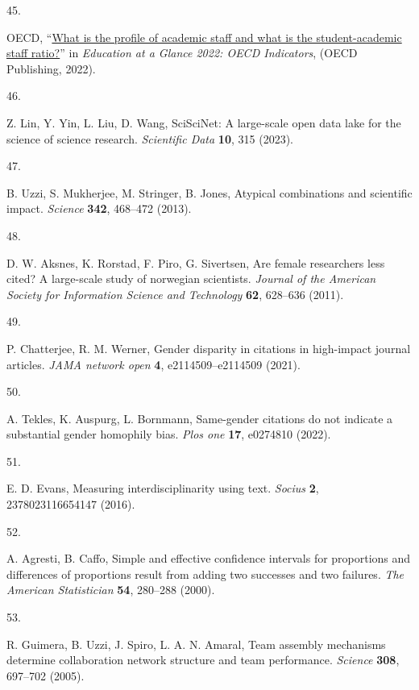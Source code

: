 \documentclass[
  british,
  11pt,
]{article}
\newlength{\cslhangindent}
\newlength{\csllabelwidth}
\newenvironment{CSLReferences}[2] %
 {\begin{list}{}{%
  \setlength{\itemindent}{0pt}
  \setlength{\leftmargin}{0pt}
  \setlength{\parsep}{0pt}
  \ifodd #1
   \setlength{\leftmargin}{\cslhangindent}
   \setlength{\itemindent}{-1\cslhangindent}
  \fi
  \setlength{\itemsep}{#2\baselineskip}}}
 {\end{list}}
\newcommand{\CSLLeftMargin}[1]{\parbox[t]{\csllabelwidth}{\strut#1\strut}}
\newcommand{\CSLRightInline}[1]{\parbox[t]{\linewidth - \csllabelwidth}{\strut#1\strut}}
\begin{document}
\begin{CSLReferences}{0}{1}
\CSLLeftMargin{45. }%
\CSLRightInline{OECD, {``\href{https://doi.org/10.1787/bb6ee273-en}{What is the profile of academic staff and what is the student-academic staff ratio?}''} in \emph{Education at a Glance 2022: OECD Indicators}, (OECD Publishing, 2022).}

\CSLLeftMargin{46. }%
\CSLRightInline{Z. Lin, Y. Yin, L. Liu, D. Wang, SciSciNet: A large-scale open data lake for the science of science research. \emph{Scientific Data} \textbf{10}, 315 (2023).}

\CSLLeftMargin{47. }%
\CSLRightInline{B. Uzzi, S. Mukherjee, M. Stringer, B. Jones, Atypical combinations and scientific impact. \emph{Science} \textbf{342}, 468--472 (2013).}

\CSLLeftMargin{48. }%
\CSLRightInline{D. W. Aksnes, K. Rorstad, F. Piro, G. Sivertsen, Are female researchers less cited? A large-scale study of norwegian scientists. \emph{Journal of the American Society for Information Science and Technology} \textbf{62}, 628--636 (2011).}

\CSLLeftMargin{49. }%
\CSLRightInline{P. Chatterjee, R. M. Werner, Gender disparity in citations in high-impact journal articles. \emph{JAMA network open} \textbf{4}, e2114509--e2114509 (2021).}

\CSLLeftMargin{50. }%
\CSLRightInline{A. Tekles, K. Auspurg, L. Bornmann, Same-gender citations do not indicate a substantial gender homophily bias. \emph{Plos one} \textbf{17}, e0274810 (2022).}

\CSLLeftMargin{51. }%
\CSLRightInline{E. D. Evans, Measuring interdisciplinarity using text. \emph{Socius} \textbf{2}, 2378023116654147 (2016).}

\CSLLeftMargin{52. }%
\CSLRightInline{A. Agresti, B. Caffo, Simple and effective confidence intervals for proportions and differences of proportions result from adding two successes and two failures. \emph{The American Statistician} \textbf{54}, 280--288 (2000).}

\CSLLeftMargin{53. }%
\CSLRightInline{R. Guimera, B. Uzzi, J. Spiro, L. A. N. Amaral, Team assembly mechanisms determine collaboration network structure and team performance. \emph{Science} \textbf{308}, 697--702 (2005).}


\end{CSLReferences}
\end{document}
